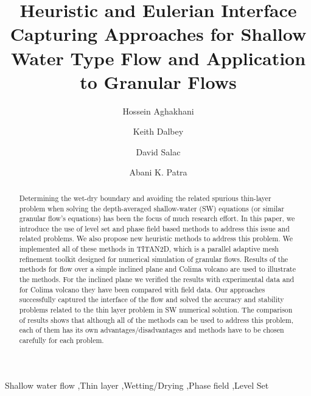 \documentclass[review]{elsarticle}
\begin{document}
\begin{frontmatter}

\title{Heuristic and Eulerian Interface Capturing Approaches for Shallow Water Type Flow and Application to Granular Flows}


\author[maeaddress]{Hossein Aghakhani}
\author[sandiaaddress]{Keith Dalbey}
\author[maeaddress]{David Salac}
\author[maeaddress]{Abani K. Patra}


\address[maeaddress]{Department of Mechanical and Aerospace Engineering, University at Buffalo, Buffalo, New York, United States}
\address[sandiaaddress]{Sandia National Laboratories, Albuquerque, New Mexico, United States}

\begin{abstract}
Determining the wet-dry boundary and avoiding the related spurious thin-layer problem when 
solving the depth-averaged shallow-water (SW) equations (or similar granular flow's equations)  has 
been the focus of much research effort. In this paper, we introduce the use of level set and phase field based methods to address this issue and related problems. We also propose new heuristic 
methods to address this problem. We implemented all of these methods in TITAN2D, which is a parallel adaptive mesh refinement toolkit designed for numerical simulation of granular flows. 
Results of the methods for flow over a simple inclined plane and Colima volcano are used to illustrate the methods. For the inclined plane we verified the results with experimental data and for 
Colima volcano they have been compared with field data. Our approaches successfully captured the interface of the flow and solved the accuracy and stability problems related to the thin layer problem in 
SW numerical solution. The comparison of results shows that although all of the methods can be used to address this problem, 
each of them has its own advantages/disadvantages and methods have to be chosen carefully for each problem. 
\end{abstract}

\begin{keyword}

Shallow water flow \sep Thin layer \sep Wetting/Drying \sep Phase field \sep Level Set

\end{keyword}

\end{frontmatter}
\end{document}
